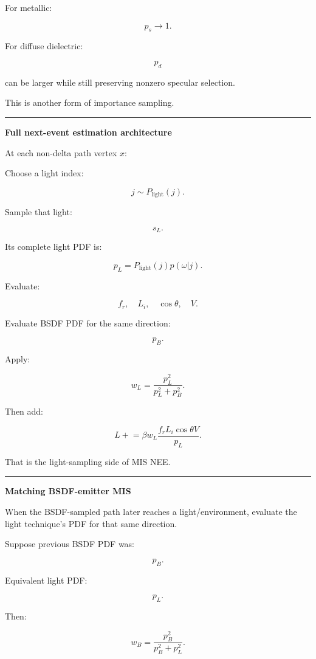 For metallic:

\[
p_s\rightarrow1.
\]

For diffuse dielectric:

\[
p_d
\]

can be larger while still preserving nonzero specular selection.

This is another form of importance sampling.

\begin{center}\rule{0.5\linewidth}{0.5pt}\end{center}

\textbf{Full next-event estimation architecture}

At each non-delta path vertex \(x\):

Choose a light index:

\[
j\sim P_{\text{light}}(j).
\]

Sample that light:

\[
s_L.
\]

Its complete light PDF is:

\[
\boxed{
p_L
=
P_{\text{light}}(j)
p(\omega|j).
}
\]

Evaluate:

\[
f_r,
\quad
L_i,
\quad
\cos\theta,
\quad
V.
\]

Evaluate BSDF PDF for the same direction:

\[
p_B.
\]

Apply:

\[
w_L=
\frac{p_L^2}{p_L^2+p_B^2}.
\]

Then add:

\[
\boxed{
L
\mathrel{+}=
\beta
w_L
\frac{
f_rL_i\cos\theta V
}{
p_L
}.
}
\]

That is the light-sampling side of MIS NEE.

\begin{center}\rule{0.5\linewidth}{0.5pt}\end{center}

\textbf{Matching BSDF-emitter MIS}

When the BSDF-sampled path later reaches a light/environment, evaluate the light technique's PDF for that same direction.

Suppose previous BSDF PDF was:

\[
p_B.
\]

Equivalent light PDF:

\[
p_L.
\]

Then:

\[
w_B
=
\frac{
p_B^2
}{
p_B^2+p_L^2
}.
\]

